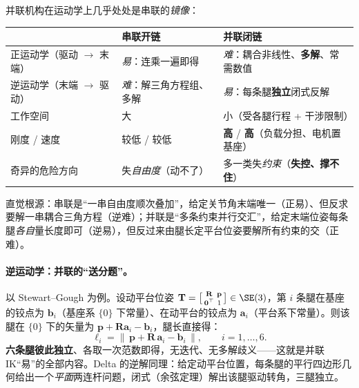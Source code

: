 \begin{insight}\label{ins:ak-parallel-duality}
并联机构在运动学上几乎处处是串联的\emph{镜像}\cite{merlet2006parallel}：
\begin{center}\small
\begin{tabular}{lll}
\toprule
 & 串联开链 & 并联闭链 \\
\midrule
正运动学（驱动 $\to$ 末端） & \emph{易}：连乘一遍即得 & \emph{难}：耦合非线性、\textbf{多解}、常需数值 \\
逆运动学（末端 $\to$ 驱动） & \emph{难}：解三角方程组、多解 & \emph{易}：每条腿\textbf{独立}闭式反解 \\
工作空间 & 大 & 小（受各腿行程 + 干涉限制） \\
刚度 / 速度 & 较低 / 较低 & \textbf{高} / \textbf{高}（负载分担、电机置基座） \\
奇异的危险方向 & 失\emph{自由度}（动不了） & 多一类失\emph{约束}（\textbf{失控、撑不住}） \\
\bottomrule
\end{tabular}
\end{center}
直觉根源：串联是“一串自由度顺次叠加”，给定关节角末端唯一（正易）、但反求要解一串耦合三角方程（逆难）；并联是“多条约束并行交汇”，给定末端位姿每条腿\emph{各自}量长度即可（逆易），但反过来由腿长定平台位姿要解所有约束的交（正难）。
\end{insight}

\paragraph{逆运动学：并联的“送分题”。}
以 Stewart--Gough 为例。设动平台位姿 $\mathbf{T}=\big[\begin{smallmatrix}\mathbf{R}&\mathbf{p}\\\mathbf{0}^\top&1\end{smallmatrix}\big]\in\SE(3)$，第 $i$ 条腿在基座的铰点为 $\mathbf{b}_i$（基座系 $\{0\}$ 下常量）、在动平台的铰点为 $\mathbf{a}_i$（平台系下常量）。则该腿在 $\{0\}$ 下的矢量为 $\mathbf{p}+\mathbf{R}\mathbf{a}_i-\mathbf{b}_i$，腿长直接得\cite{merlet2006parallel}：
\begin{equation}
  \ell_i=\big\|\,\mathbf{p}+\mathbf{R}\,\mathbf{a}_i-\mathbf{b}_i\,\big\|,\qquad i=1,\dots,6.
  \label{eq:ak-stewart-ik}
\end{equation}
\textbf{六条腿彼此独立}、各取一次范数即得，无迭代、无多解歧义——这就是并联 IK“易”的全部内容。Delta 的逆解同理：给定动平台位置，每条腿的平行四边形几何给出一个\emph{平面}两连杆问题，闭式（余弦定理）解出该腿驱动转角，三腿独立。

